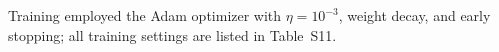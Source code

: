 Training employed the Adam optimizer with $\eta = 10^{-3}$, weight decay, and early stopping; all training settings are listed in Table~S11.
